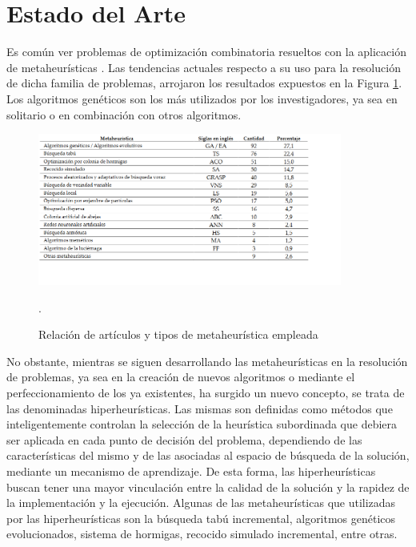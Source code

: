 \documentclass[a4paper,12pt]{book}
\begin{document}
	
	
	\section{Estado del Arte}
	Es común ver problemas de optimización combinatoria resueltos con la aplicación de metaheurísticas \cite{marti2003procedimientos}. Las tendencias actuales respecto a su uso para la resolución de dicha familia de problemas, arrojaron los resultados expuestos en la Figura \ref{EoAmetaheuristicas}. Los algoritmos genéticos son los más utilizados por los investigadores, ya sea en solitario o en combinación con otros algoritmos. \\
	
	\begin{figure}[h]
		\centering
		\includegraphics[width=10cm]{./Graphics/EoAmetaheuristicas.png}
		\caption{Relación de artículos y tipos de metaheurística empleada} \cite{EOAgomez2014metaheuristicas}.
		\label{EoAmetaheuristicas}
	\end{figure}
	
	No obstante, mientras se siguen desarrollando las metaheurísticas en la resolución de problemas, ya sea en la  creación  de nuevos algoritmos o mediante el perfeccionamiento de los ya existentes, ha surgido un nuevo concepto, se trata de las denominadas hiperheurísticas. Las mismas son definidas como métodos que inteligentemente controlan la selección de la heurística subordinada que debiera ser aplicada en cada punto de decisión del problema, dependiendo de las características del mismo y de las asociadas al espacio de búsqueda de la solución, mediante un mecanismo de aprendizaje. De esta forma, las hiperheurísticas buscan  tener una mayor vinculación entre la calidad de la solución y la rapidez de la implementación y la ejecución. Algunas de las metaheurísticas que utilizadas por las hiperheurísticas son  la búsqueda  tabú  incremental,  algoritmos  genéticos evolucionados, sistema de hormigas, recocido simulado incremental, entre otras. \\
	
\end{document}
